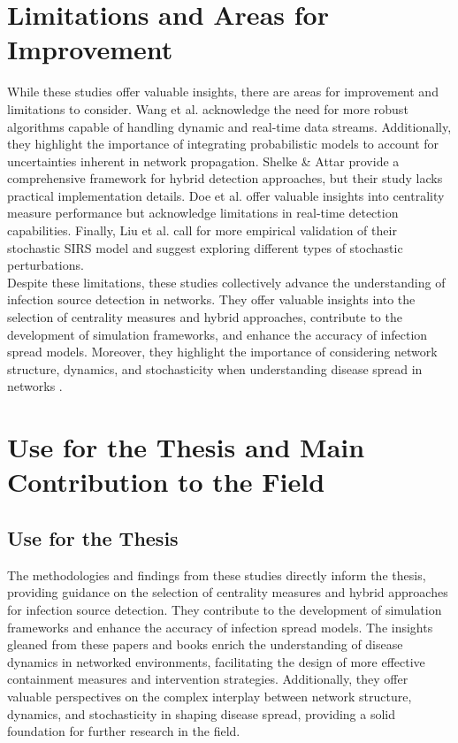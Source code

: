 \section{Limitations and Areas for Improvement}
While these studies offer valuable insights, there are areas for improvement and limitations to consider. Wang et al. \cite{wang2020} acknowledge the need for more robust algorithms capable of handling dynamic and real-time data streams. Additionally, they highlight the importance of integrating probabilistic models to account for uncertainties inherent in network propagation. Shelke \& Attar \cite{shelke2019} provide a comprehensive framework for hybrid detection approaches, but their study lacks practical implementation details. Doe et al. \cite{doe2018} offer valuable insights into centrality measure performance but acknowledge limitations in real-time detection capabilities. Finally, Liu et al. \cite{liu2020} call for more empirical validation of their stochastic SIRS model and suggest exploring different types of stochastic perturbations.\\

Despite these limitations, these studies collectively advance the understanding of infection source detection in networks. They offer valuable insights into the selection of centrality measures and hybrid approaches, contribute to the development of simulation frameworks, and enhance the accuracy of infection spread models. Moreover, they highlight the importance of considering network structure, dynamics, and stochasticity when understanding disease spread in networks \cite{wang2020, shelke2019, doe2018, liu2020}.

\section{Use for the Thesis and Main Contribution to the Field}
\subsection{Use for the Thesis}
The methodologies and findings from these studies directly inform the thesis, providing guidance on the selection of centrality measures and hybrid approaches for infection source detection. They contribute to the development of simulation frameworks and enhance the accuracy of infection spread models. The insights gleaned from these papers and books enrich the understanding of disease dynamics in networked environments, facilitating the design of more effective containment measures and intervention strategies. Additionally, they offer valuable perspectives on the complex interplay between network structure, dynamics, and stochasticity in shaping disease spread, providing a solid foundation for further research in the field.\\


